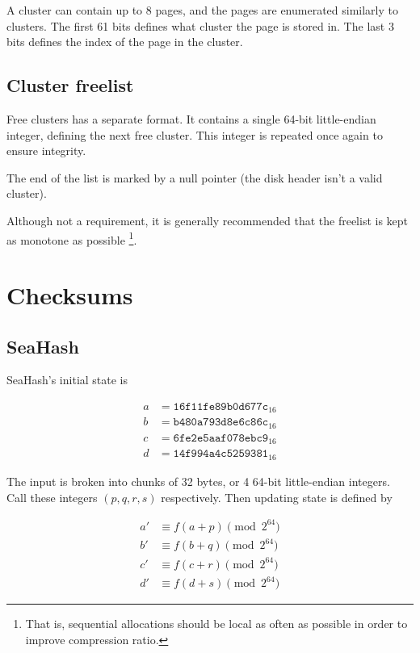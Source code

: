 \documentclass[11pt,a4paper]{report}
\begin{document}
        A cluster can contain up to 8 pages, and the pages are enumerated
        similarly to clusters. The first 61 bits defines what cluster the page
        is stored in. The last 3 bits defines the index of the page in the
        cluster.

        \subsection{Cluster freelist}
        \label{cluster:freelist}
        Free clusters has a separate format. It contains a single 64-bit
        little-endian integer, defining the next free cluster. This integer is
        repeated once again to ensure integrity.

        The end of the list is marked by a null pointer (the disk header isn't
        a valid cluster).

        Although not a requirement, it is generally recommended that the
        freelist is kept as monotone as possible \footnote{That is,
        sequential allocations should be local as often as possible in order
        to improve compression ratio.}.

    \section{Checksums}
        \subsection{SeaHash}
        \label{checksum:seahash}
        SeaHash's initial state is

        \begin{align*}
            a &= \texttt{16f11fe89b0d677c}_{16} \\
            b &= \texttt{b480a793d8e6c86c}_{16} \\
            c &= \texttt{6fe2e5aaf078ebc9}_{16} \\
            d &= \texttt{14f994a4c5259381}_{16}
        \end{align*}

        The input is broken into chunks of 32 bytes, or 4 64-bit little-endian
        integers. Call these integers $(p, q, r, s)$ respectively. Then
        updating state is defined by

        \begin{align*}
            a' &\equiv f(a + p) \pmod{2^{64}} \\
            b' &\equiv f(b + q) \pmod{2^{64}} \\
            c' &\equiv f(c + r) \pmod{2^{64}} \\
            d' &\equiv f(d + s) \pmod{2^{64}}
        \end{align*}
\end{document}
